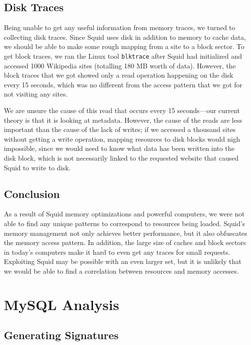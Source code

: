 \documentclass[11pt, oneside]{article}
\begin{document}
\subsection{Disk Traces}

Being unable to get any useful information from memory traces, we turned to 
collecting disk traces. Since Squid uses disk in addition to memory to cache 
data, we should be able to make some rough mapping from a site to a block
sector. To get block traces, we ran the Linux tool {\tt blktrace} after
Squid had initialized and accessed 1000 Wikipedia sites (totalling 180 MB
worth of data). However, the block traces that we got showed only a read 
operation happening on the disk every 15 seconds, which was no different from 
the access pattern that we got for not visiting any sites.

We are unsure the cause of this read that occurs every 15 seconds---our 
current theory is that it is looking at metadata. However, the cause of the 
reads are less important than the cause of the lack of writes; if we
accessed a thousand sites without getting a write operation, mapping resources 
to disk blocks would nigh impossible, since we would need to know what data
has been written into the disk block, which is not necessarily linked to the
requested website that caused Squid to write to disk.

\subsection{Conclusion}

As a result of Squid memory optimizations and powerful computers, we were 
not able to find any unique patterns to correspond to resources being loaded. 
Squid's memory management not only achieves better performance, but it also 
obfuscates the memory access pattern. In addition, the large size of caches
and block sectors in today's computers make it hard to even get any traces 
for small requests. Exploiting Squid may be possible with an even larger
set, but it is unlikely that we would be able to find a correlation between
resources and memory accesses.

\section{MySQL Analysis}

\subsection{Generating Signatures}
\end{document}
